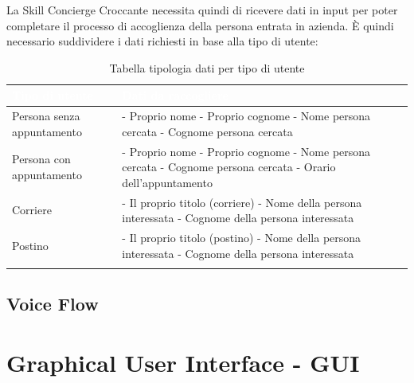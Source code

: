 La Skill Concierge Croccante necessita quindi di ricevere dati in input per poter completare il processo di accoglienza della persona entrata in azienda. È quindi necessario suddividere i dati richiesti in base alla tipo di utente:
\begin{center}
	\centering
	\renewcommand{\arraystretch}{1.5}
	\begin{longtable}{  p{4.5cm} p{8.3cm} }
		\rowcolor{tableHead}
		\textbf{\textcolor{white}{Tipo di utente}} & \textbf{\textcolor{white}{Dati da raccogliere}} \\
		\endhead  
		
		Persona senza \mbox{appuntamento} &  - Proprio nome \newline - Proprio cognome \newline - Nome persona cercata  \newline - Cognome persona cercata \\
		Persona con \mbox{appuntamento} &  - Proprio nome \newline - Proprio cognome \newline - Nome persona cercata  \newline - Cognome persona cercata \newline - Orario dell'appuntamento \\
		Corriere &  - Il proprio titolo (corriere) \newline - Nome della persona interessata \newline - Cognome della persona interessata \\
		Postino &  - Il proprio titolo (postino) \newline - Nome della persona interessata \newline - Cognome della persona interessata \\
		\rowcolor{white}
		\caption{Tabella tipologia dati per tipo di utente}
	\end{longtable}
\end{center}
\subsection{Voice Flow}
\section{Graphical User Interface - GUI}
